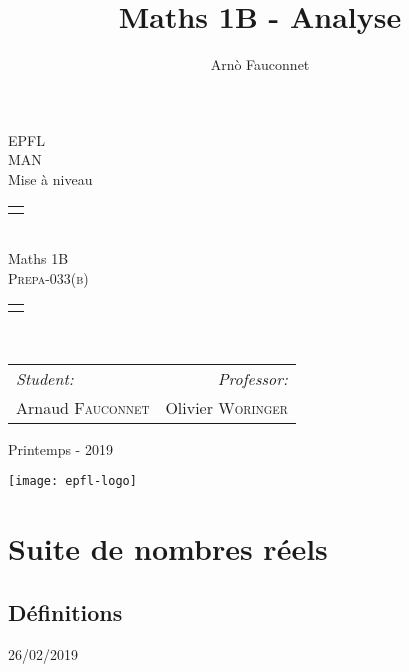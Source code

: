 \documentclass[
    11pt,
    a4paper,
    oneside,
    headinlcude, footinclude,
    twoside,
]{report}
\title{Maths 1B - Analyse}
\author{Arnò Fauconnet}
\newcommand{\markDate}[1]{\begin{flushright}#1\end{flushright}}
\begin{document}
\begin{titlepage}
   \begin{center}
       \vspace*{\fill}

       {\Huge EPFL}\\ 
       \vfill
       {\huge MAN}\\ [1em]
       {\Large Mise à niveau}\\
        \vfill
        \begin{tabularx}{\textwidth}{X}
            \Xhline{3\arrayrulewidth}\\
        \end{tabularx}\\ [2em]
        {\Huge Maths 1B} \\ [1em]
        \textsc{\huge Prepa-033(b)} \\ [2em]
        \begin{tabularx}{\textwidth}{X}
            \Xhline{3\arrayrulewidth}\\
        \end{tabularx}\\ [2em]
        \vspace{.7cm}
        {\large
        \begin{tabularx}{.9\textwidth}{Xr}
            \textit{Student:} & \textit{Professor:}\\
            Arnaud \textsc{Fauconnet} & Olivier \textsc{Woringer}
        \end{tabularx}}
        \vfill
        {\Large Printemps - 2019}

        \vfill
        \texttt{[image: epfl-logo]}

       \vfill
   \end{center} 
\end{titlepage} 
\setcounter{chapter}{0}
\chapter{Suite de nombres réels}

\section{Définitions}
\markDate{26/02/2019}
\end{document}
